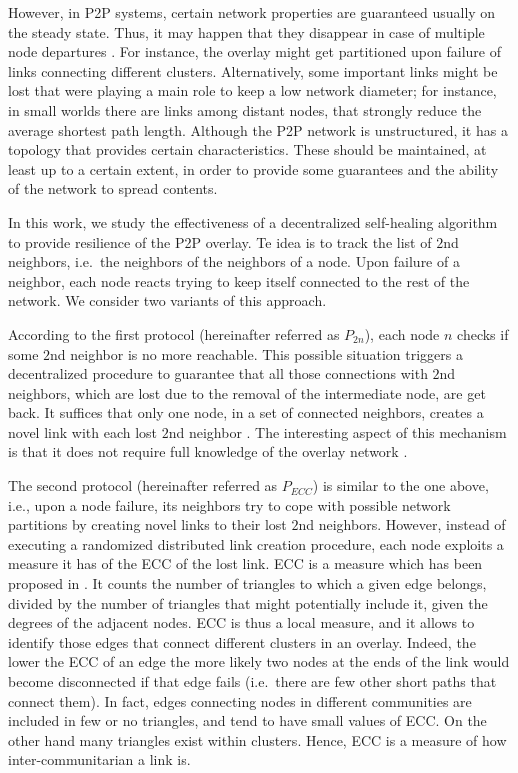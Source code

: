 \documentclass[10pt, conference, compsocconf]{IEEEtran}
\begin{document}
However, in P2P systems, certain network properties are guaranteed usually on the steady state. Thus, 
it may happen that they disappear in case of multiple node departures \cite{Leonard:2005}. For instance, the overlay might get partitioned upon failure of links connecting different clusters. 
Alternatively, some important links might be lost that were playing a main role to keep a low network diameter; for instance, in small worlds there are links among distant nodes, that strongly reduce the average shortest path length.
Although the P2P network is unstructured, it has a topology that provides certain characteristics. These should be maintained, at least up to a certain extent, in order to provide some guarantees and the ability of the network to spread contents.

In this work, we study the effectiveness of a decentralized self-healing algorithm to provide resilience of the P2P overlay. 
Te idea is to track the list of $2$nd neighbors, i.e.~the neighbors of the neighbors of a node. Upon failure of a neighbor, each node reacts trying to keep itself connected to the rest of the network.
We consider two variants of this approach. 

According to the first protocol (hereinafter referred as $P_{2n}$), 
each node $n$ checks if some $2$nd neighbor is no more reachable. This possible situation triggers a decentralized procedure to guarantee that all those connections with $2$nd neighbors, which are lost due to the removal of the intermediate node, are get back.
It suffices that only one node, in a set of connected neighbors, creates a novel link with each lost $2$nd neighbor \cite{simplex13}.
The interesting aspect of this mechanism is that it does not require full knowledge of the overlay network \cite{massoulie,VoulgarisGS05}. 

The second protocol (hereinafter referred as $P_{ECC}$) is similar to the one above, i.e., upon a node failure, its neighbors try to cope with possible network partitions by creating novel links to their lost $2$nd neighbors. However, instead of executing a randomized distributed link creation procedure, each node exploits a measure it has of the \ac{ECC} of the lost link.
\ac{ECC} is a measure which has been proposed in \cite{radicchi2004}. It counts the number of triangles to which a given edge belongs, divided by the number of triangles that might potentially include it, given the degrees of the adjacent nodes.
ECC is thus a local measure, and it allows to identify those edges that connect different clusters in an overlay. 
Indeed, the lower the ECC of an edge the more likely two nodes at the ends of the link would become disconnected if that edge fails (i.e.~there are few other short paths that connect them).
In fact, edges connecting nodes in different communities are included in few or no triangles, and tend to have small values of ECC. On the other hand many triangles exist within clusters. Hence, ECC is a measure of how inter-communitarian a link is.
\end{document}
